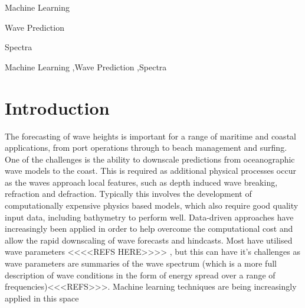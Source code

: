 \documentclass[a4paper,fleqn]{cas-sc}
\begin{document}

\begin{highlights}
\item Machine Learning
\item Wave Prediction
\item Spectra
\end{highlights}

\begin{keywords}
Machine Learning \sep Wave Prediction \sep Spectra
\end{keywords}

\maketitle

\section{Introduction}\label{Intro}
The forecasting of wave heights is important for a range of maritime and coastal applications, from port operations through to beach management and surfing. One of the challenges is the ability to downscale predictions from oceanographic wave models to the coast. This is required as additional physical processes occur as the waves approach local features, such as depth induced wave breaking, refraction and defraction. Typically this involves the development of computationally expensive physics based models, which also require good quality input data, including bathymetry to perform well.
Data-driven approaches have increasingly been applied in order to help overcome the computational cost and allow the rapid downscaling of wave forecasts and hindcasts. Most have utilised wave parameters <<<<REFS HERE>>>> , but this can have it's challenges as wave parameters are summaries of the wave spectrum (which is a more full description of wave conditions in the form of energy spread over a range of frequencies)<<<REFS>>>. 
Machine learning techniques are being increasingly applied in this space

\subsection{}
\end{document}
